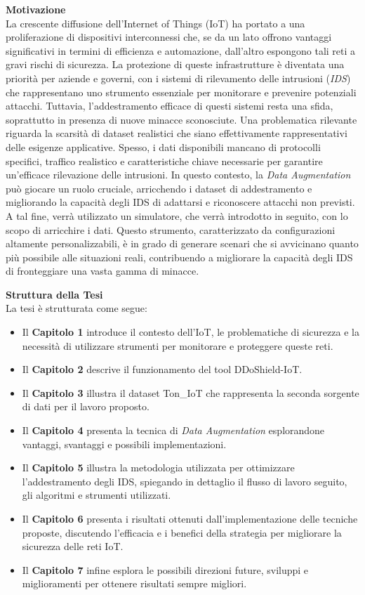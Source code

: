 \textbf{Motivazione}\\
La crescente diffusione dell'Internet of Things (IoT) ha portato a una proliferazione di dispositivi interconnessi che, se da un lato offrono vantaggi significativi in termini di efficienza e automazione, dall'altro espongono tali reti a gravi rischi di sicurezza. La protezione di queste infrastrutture è diventata una priorità per aziende e governi, con i sistemi di rilevamento delle intrusioni (\textit{IDS}) che rappresentano uno strumento essenziale per monitorare e prevenire potenziali attacchi. Tuttavia, l'addestramento efficace di questi sistemi resta una sfida, soprattutto in presenza di nuove minacce sconosciute.
Una problematica rilevante riguarda la scarsità di dataset realistici che siano effettivamente rappresentativi delle esigenze applicative. Spesso, i dati disponibili mancano di protocolli specifici, traffico realistico e caratteristiche chiave necessarie per garantire un'efficace rilevazione delle intrusioni. In questo contesto, la \textit{Data Augmentation} può giocare un ruolo cruciale, arricchendo i dataset di addestramento e migliorando la capacità degli IDS di adattarsi e riconoscere attacchi non previsti.
A tal fine, verrà utilizzato un simulatore, che verrà introdotto in seguito, con lo scopo di arricchire i dati. Questo strumento, caratterizzato da configurazioni altamente personalizzabili, è in grado di generare scenari che si avvicinano quanto più possibile alle situazioni reali, contribuendo a migliorare la capacità degli IDS di fronteggiare una vasta gamma di minacce.


\textbf{Struttura della Tesi}\\
La tesi è strutturata come segue:

\begin{itemize}
    \item Il \textbf{Capitolo 1} introduce il contesto dell'IoT, le problematiche di sicurezza e la necessità di utilizzare strumenti per monitorare e proteggere queste reti.
    \item Il \textbf{Capitolo 2} descrive il funzionamento del tool DDoShield-IoT.
    \item Il \textbf{Capitolo 3} illustra il dataset Ton\_IoT che rappresenta la seconda sorgente di dati per il lavoro proposto.
    \item Il \textbf{Capitolo 4} presenta la tecnica di \textit{Data Augmentation} esplorandone vantaggi, svantaggi e possibili implementazioni.
    \item Il \textbf{Capitolo 5} illustra la metodologia utilizzata per ottimizzare l'addestramento degli IDS, spiegando in dettaglio il flusso di lavoro seguito, gli algoritmi e strumenti utilizzati.
    \item Il \textbf{Capitolo 6} presenta i risultati ottenuti dall'implementazione delle tecniche proposte, discutendo l'efficacia e i benefici della strategia per migliorare la sicurezza delle reti IoT.
    \item Il \textbf{Capitolo 7} infine esplora le possibili direzioni future, sviluppi e miglioramenti per ottenere risultati sempre migliori.
\end{itemize}
